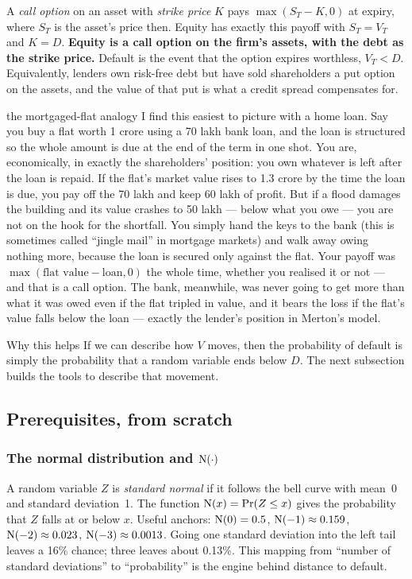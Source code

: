 A \emph{call option} on an asset with \emph{strike price} $K$ pays $\max(S_T-K,0)$ at expiry, where $S_T$ is the asset's price then. Equity has exactly this payoff with $S_T=V_T$ and $K=D$. \textbf{Equity is a call option on the firm's assets, with the debt as the strike price.} Default is the event that the option expires worthless, $V_T<D$. Equivalently, lenders own risk-free debt but have sold shareholders a put option on the assets, and the value of that put is what a credit spread compensates for.

\begin{defbox}{the mortgaged-flat analogy}
I find this easiest to picture with a home loan. Say you buy a flat worth 1 crore using a 70 lakh bank loan, and the loan is structured so the whole amount is due at the end of the term in one shot. You are, economically, in exactly the shareholders' position: you own whatever is left after the loan is repaid. If the flat's market value rises to 1.3 crore by the time the loan is due, you pay off the 70 lakh and keep 60 lakh of profit. But if a flood damages the building and its value crashes to 50 lakh — below what you owe — you are not on the hook for the shortfall. You simply hand the keys to the bank (this is sometimes called ``jingle mail'' in mortgage markets) and walk away owing nothing more, because the loan is secured only against the flat. Your payoff was $\max(\text{flat value} - \text{loan}, 0)$ the whole time, whether you realised it or not — and that is a call option. The bank, meanwhile, was never going to get more than what it was owed even if the flat tripled in value, and it bears the loss if the flat's value falls below the loan — exactly the lender's position in Merton's model.
\end{defbox}

\begin{keybox}{Why this helps}
If we can describe how $V$ moves, then the probability of default is simply the probability that a random variable ends below $D$. The next subsection builds the tools to describe that movement.
\end{keybox}

\subsection{Prerequisites, from scratch}

\subsubsection{The normal distribution and $\mathrm{N}(\cdot)$}
A random variable $Z$ is \emph{standard normal} if it follows the bell curve with mean~0 and standard deviation~1. The function $\mathrm{N}(x)=\Pr(Z\le x)$ gives the probability that $Z$ falls at or below $x$. Useful anchors: $\mathrm{N}(0)=0.5$, $\mathrm{N}(-1)\approx0.159$, $\mathrm{N}(-2)\approx0.023$, $\mathrm{N}(-3)\approx0.0013$. Going one standard deviation into the left tail leaves a 16\% chance; three leaves about 0.13\%. This mapping from ``number of standard deviations'' to ``probability'' is the engine behind distance to default.

